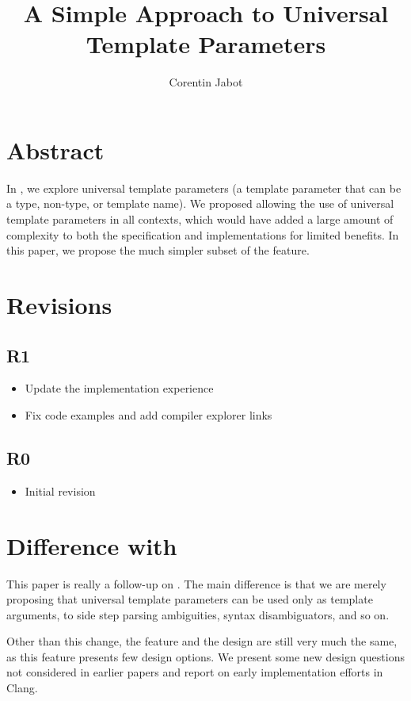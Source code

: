 \documentclass{wg21}
\title{A Simple Approach to Universal Template Parameters}
\author{Corentin Jabot}{corentin.jabot@gmail.com}
\begin{document}
\maketitle

\section{Abstract}
In , we explore universal template parameters (a template parameter that can be a type, non-type, or template name).
We proposed allowing the use of universal template parameters in all contexts, which would have added a large amount of complexity to both the specification and implementations
for limited benefits. In this paper, we propose the much simpler subset of the feature.


\section{Revisions}

\subsection{R1}

\begin{itemize}
    \item Update the implementation experience
    \item Fix code examples and add compiler explorer links
\end{itemize}

\subsection{R0}

\begin{itemize}
    \item{Initial revision}
\end{itemize}


\section{Difference with }

This paper is really a follow-up on .
The main difference is that we are merely proposing that universal template parameters can be used only as template arguments, to side step parsing ambiguities, syntax disambiguators, and so on.

Other than this change, the feature and the design are still very much the same, as this feature presents few design options.
We present some new design questions not considered in earlier papers and report on early implementation efforts in Clang.
\end{document}
